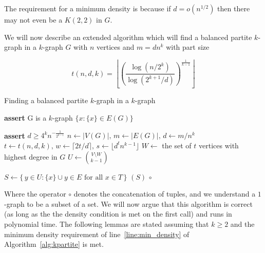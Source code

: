 \begin{remark}
    The requirement for a minimum density is because if $d = o\left(n^{1/2}\right)$ then
    there may not even be a $K(2, 2)$ in $G$. %
\end{remark}

We will now describe an extended algorithm which will find a balanced partite $k$-graph in a $k$-graph $G$ with
$n$ vertices and $m = d n^k$ with part size

\[
    t (n, d, k) = \left\lfloor \left(  \frac{\log (n/2^k)}{\log (2^{k+1}/d)} \right)^{\frac{1}{k-1}} \right\rfloor
\]

\begin{algorithm}
    \caption{Finding a balanced partite $k$-graph in a $k$-graph}
    \label{alg:kpartite}
    \begin{algorithmic}[1]
            \State \textbf{assert} G is a $k$-graph
                \State \Return $\{x : \{x\} \in E(G)\}$
            \EndIf

            \State \textbf{assert} $d \geq 4^k n^{-\frac{1}{2^{k-1}}}$ \label{line:min_density}
            \State $n \gets |V(G)|,\, m \gets |E(G)|,\, d \gets m/n^k$
            \State $t \gets t(n, d, k),\, w \gets \lceil 2t/d \rceil,\, s \gets \lfloor d^t n^{k-1} \rfloor$ \label{line:tws}
            \State $W \gets$ the set of $t$ vertices with highest degree in $G$ \label{line:W}
            \State $U \gets \binom{V\setminus W}{k-1}$

             \label{line:for}
                \State $S \gets \{\,y \in U : \{x\} \cup y \in E \text{ for all } x \in T\,\}$
                    \State \Return $(S)\, \circ $ \label{line:return}
                \EndIf
            \EndFor
        \EndFunction
    \end{algorithmic}
\end{algorithm}

Where the operator $\circ$ denotes the concatenation of tuples, and we
understand a $1$-graph to be a subset of a set.
We will now argue that this algorithm is correct (as long as the the density condition is met on the first call)
and runs in polynomial time.
The following lemmas are stated assuming that $k \geq 2$ and
the minimum density requirement of line~\ref{line:min_density} of Algorithm~\ref{alg:kpartite} is met.

